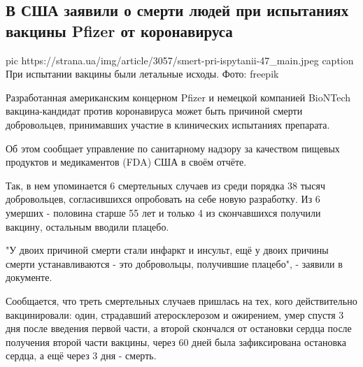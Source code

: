  
 
 
 
 
 
\subsection{В США заявили о смерти людей при испытаниях вакцины Pfizer от коронавируса}
\label{sec:09_12_2020.news.ua.strana.2.smert_pfizer_vaccine}


\ifcmt
pic https://strana.ua/img/article/3057/smert-pri-ispytanii-47_main.jpeg
caption При испытании вакцины были летальные исходы. Фото: freepik 
\fi

Разработанная американским концерном Pfizer  и немецкой компанией BioNTech
вакцина-кандидат против коронавируса может быть причиной смерти добровольцев,
принимавших участие в клинических испытаниях препарата.

Об этом сообщает управление по санитарному надзору за качеством пищевых
продуктов и медикаментов (FDA) США в своём отчёте.

Так, в нем упоминается 6 смертельных случаев из среди порядка 38 тысяч
добровольцев, согласившихся опробовать на себе новую разработку. Из 6 умерших -
половина старше 55 лет и только 4 из скончавшихся получили вакцину, остальным
вводили плацебо.

"У двоих причиной смерти стали инфаркт и инсульт, ещё у двоих причины смерти
устанавливаются - это добровольцы, получившие плацебо", - заявили в документе. 

Сообщается, что треть смертельных случаев пришлась на тех, кого действительно
вакцинировали: один, страдавший атеросклерозом и ожирением, умер спустя 3 дня
после введения первой части, а второй скончался от остановки сердца после
получения второй части вакцины, через 60 дней была зафиксирована остановка
сердца, а ещё через 3 дня - смерть.


